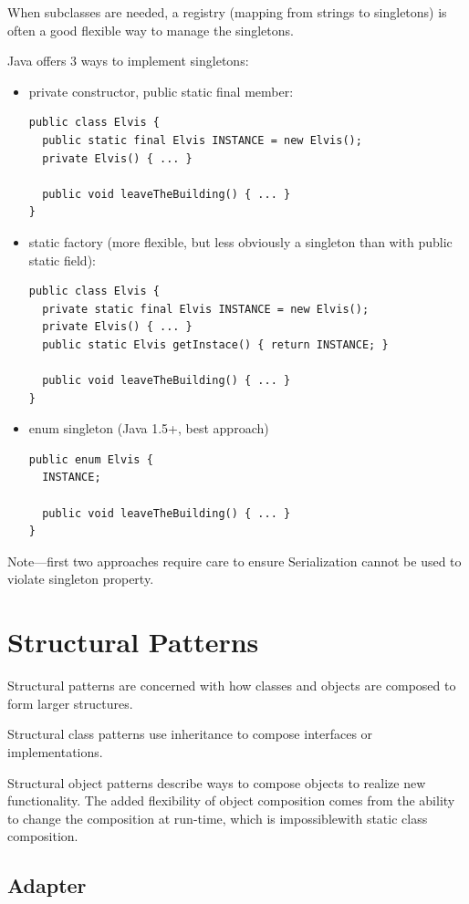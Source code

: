 \documentclass[11pt]{report}
\begin{document}
When subclasses are needed, a registry (mapping from strings to singletons) is often a good flexible
way to manage the singletons.

Java offers 3 ways to implement singletons:
\begin{itemize}
\item private constructor, public static final member:
\begin{lstlisting}
public class Elvis {
  public static final Elvis INSTANCE = new Elvis();
  private Elvis() { ... }

  public void leaveTheBuilding() { ... }
}
\end{lstlisting}
\item static factory (more flexible, but less obviously a singleton than with public static field):
\begin{lstlisting}
public class Elvis {
  private static final Elvis INSTANCE = new Elvis();
  private Elvis() { ... }
  public static Elvis getInstace() { return INSTANCE; }

  public void leaveTheBuilding() { ... }
}
\end{lstlisting}
\item enum singleton (Java 1.5+, best approach)
\begin{lstlisting}
public enum Elvis {
  INSTANCE;

  public void leaveTheBuilding() { ... }
}
\end{lstlisting}

\end{itemize}
Note---first two approaches require care to ensure Serialization cannot be used to
violate singleton property.

\chapter{Structural Patterns}
Structural patterns are concerned with how classes and objects are
composed to form larger structures. 

Structural class patterns use inheritance to compose interfaces or implementations. 

Structural object patterns describe ways to compose objects to realize new functionality. 
The added flexibility of object composition comes from the ability to change the 
composition at run-time, which is impossiblewith static class composition.

\section{Adapter}
\end{document}
